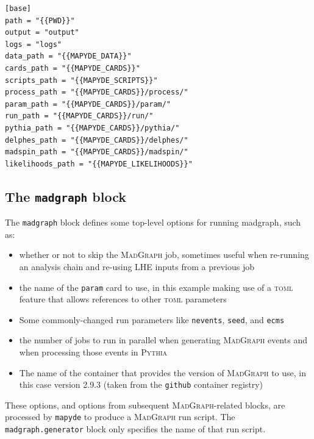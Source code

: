\documentclass{article}
\newcommand{\mapyde}{\texttt{mapyde}}
\newcommand{\madgraph}{\textsc{MadGraph}}
\newcommand{\pythia}{\textsc{Pythia}}
\newcommand{\toml}{\textsc{toml}}
\begin{document}
\begin{listing}[H]
	\begin{verbatim}
[base]
path = "{{PWD}}"
output = "output"
logs = "logs"
data_path = "{{MAPYDE_DATA}}"
cards_path = "{{MAPYDE_CARDS}}"
scripts_path = "{{MAPYDE_SCRIPTS}}"
process_path = "{{MAPYDE_CARDS}}/process/"
param_path = "{{MAPYDE_CARDS}}/param/"
run_path = "{{MAPYDE_CARDS}}/run/"
pythia_path = "{{MAPYDE_CARDS}}/pythia/"
delphes_path = "{{MAPYDE_CARDS}}/delphes/"
madspin_path = "{{MAPYDE_CARDS}}/madspin/"
likelihoods_path = "{{MAPYDE_LIKELIHOODS}}"
        \end{verbatim}
	\caption{The \texttt{base} block of an example \toml{} configuration file for generating slepton events.}
	\label{slepton-config-base}
\end{listing}

\subsection{The \texttt{madgraph} block}
\label{ssec:the-madgraph-block}

The \texttt{madgraph} block defines some top-level options for running madgraph, such as:

\begin{itemize}
	\item whether or not to skip the \madgraph{} job, sometimes useful when re-running an analysis chain and re-using LHE inputs from a previous job
	\item the name of the \texttt{param} card to use, in this example making use of a \toml{} feature that allows references to other \toml{} parameters
	\item Some commonly-changed run parameters like \texttt{nevents}, \texttt{seed}, and \texttt{ecms}
	\item the number of jobs to run in parallel when generating \madgraph{} events and when processing those events in \pythia
	\item The name of the container that provides the version of \madgraph{} to use, in this case version 2.9.3 (taken from the \texttt{github} container registry)
\end{itemize}



These options, and options from subsequent \madgraph-related blocks, are processed by \mapyde{} to produce a \madgraph{} run script.  The \texttt{madgraph.generator} block only specifies the name of that run script.
\end{document}
